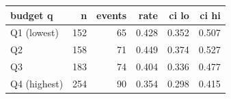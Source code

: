 \begin{tabular}{lrrrrr}
\toprule
budget q & n & events & rate & ci lo & ci hi \\
\midrule
Q1 (lowest) & 152 & 65 & 0.428 & 0.352 & 0.507 \\
Q2 & 158 & 71 & 0.449 & 0.374 & 0.527 \\
Q3 & 183 & 74 & 0.404 & 0.336 & 0.477 \\
Q4 (highest) & 254 & 90 & 0.354 & 0.298 & 0.415 \\
\bottomrule
\end{tabular}